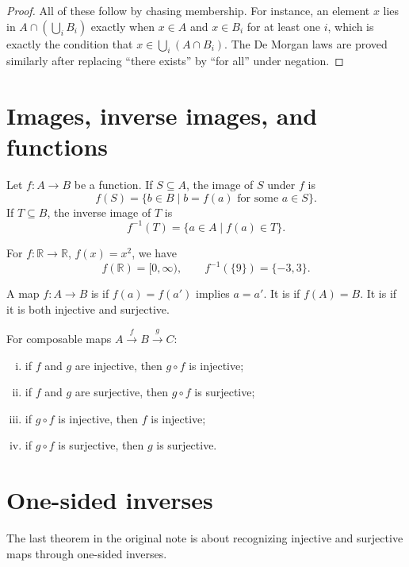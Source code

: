\begin{proof}
All of these follow by chasing membership.  For instance, an element \(x\) lies in \(A\cap(\bigcup_i B_i)\) exactly when \(x\in A\) and \(x\in B_i\) for at least one \(i\), which is exactly the condition that \(x\in \bigcup_i(A\cap B_i)\).  The De Morgan laws are proved similarly after replacing ``there exists'' by ``for all'' under negation.
\end{proof}

\section{Images, inverse images, and functions}

Let \(f:A\to B\) be a function.  If \(S\subseteq A\), the image of \(S\) under \(f\) is
\[
  f(S)=\{b\in B\mid b=f(a)\text{ for some }a\in S\}.
\]
If \(T\subseteq B\), the inverse image of \(T\) is
\[
  f^{-1}(T)=\{a\in A\mid f(a)\in T\}.
\]

\begin{example}
For \(f:\mathbb R\to\mathbb R\), \(f(x)=x^2\), we have
\[
  f(\mathbb R)=[0,\infty),
  \qquad
  f^{-1}(\{9\})=\{-3,3\}.
\]
\end{example}

A map \(f:A\to B\) is  if \(f(a)=f(a')\) implies \(a=a'\).  It is  if \(f(A)=B\).  It is  if it is both injective and surjective.

\begin{proposition}
For composable maps \(A\xrightarrow{f}B\xrightarrow{g}C\):
\begin{enumerate}[(i)]
  \item if \(f\) and \(g\) are injective, then \(g\circ f\) is injective;
  \item if \(f\) and \(g\) are surjective, then \(g\circ f\) is surjective;
  \item if \(g\circ f\) is injective, then \(f\) is injective;
  \item if \(g\circ f\) is surjective, then \(g\) is surjective.
\end{enumerate}
\end{proposition}

\section{One-sided inverses}

The last theorem in the original note is about recognizing injective and surjective maps through one-sided inverses.

